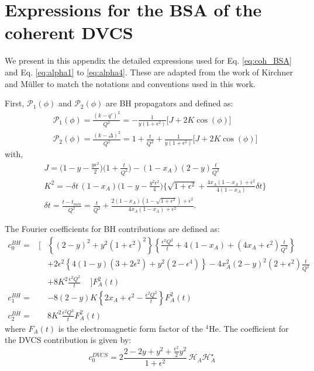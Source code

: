 \documentclass[aps,prc,preprint,superscriptaddress]{revtex4}
\begin{document}
\appendix
\section{Expressions for the BSA of the coherent DVCS}
\label{sec:eq}

We present in this appendix the detailed expressions used for Eq. \ref{eq:coh_BSA} 
and Eq. \ref{eq:alpha1} to \ref{eq:alpha4}. These are adapted from the work of 
Kirchner and Müller \cite{Kirchner:2003wt} to match the notations and conventions used
in this work.
	
First, $\mathcal{P}_{1}(\phi)$ and $\mathcal{P}_{2}(\phi)$ are BH propagators and defined as:
\begin{align}
&\mathcal{P}_{1}(\phi) = \frac{(k - q')^{2}}{Q^{2}} = - \frac{1}{y (1 + \epsilon^{2})} 
\big[ J + 2 K \cos(\phi) \big] \\
&\mathcal{P}_{2}(\phi) = \frac{(k - \Delta)^{2}}{Q^{2}} = 1 + \frac{t}{Q^{2}} + 
\frac{1}{y (1 + \epsilon^{2})} \big[ J + 2 K \cos(\phi) \big]
\end{align}
with,
\begin{align}
& J = \bigg( 1 - y - \frac{y \epsilon^{2}}{2} \bigg) \bigg(1 + \frac{t}{Q^{2}} \bigg) - 
(1 - x_{A})(2 - y) \frac{t}{Q^{2}} \\
& K^{2} = - \delta t \, (1 - x_{A}) \bigg( 1 - y - \frac{y^{2} \epsilon^{2}}{4} \bigg) 
\bigg\{ \sqrt{1 + \epsilon^{2}} + \frac{4 x_{A} (1-x_{A}) + \epsilon^{2}}{4 (1 - x_{A})}
\delta t \bigg\} \\
& \delta t = \frac{t - t_{min}}{Q^{2}} = \frac{t}{Q^{2}} + \frac{2(1-x_{A}) \left(1- \sqrt{1 + 
\epsilon^{2}} \right) + \epsilon^{2}}{4 x_{A} (1- x_{A}) + \epsilon^{2}}.
\end{align}

The Fourier coefficients for BH contributions are defined as:
\begin{eqnarray}
c_0^{BH} = & \bigg[ & \left\{ {(2-y)}^2 + y^2{(1+\epsilon^2)}^2 \right\} 
\left\{ \frac{\epsilon^2 Q^2}{t} + 4 (1-x_A) + (4x_A+\epsilon^2) \frac{t}{Q^2} 
\right\} \nonumber \\
& \phantom{\bigg[} & + 2 \epsilon^2 \left\{ 4(1-y)(3+2\epsilon^2) + y^2(2-\epsilon^4) 
\right\} - 4 x_A^2{(2-y)}^2 (2+\epsilon^2) \frac{t}{Q^2} \nonumber \\
& \phantom{\bigg[} & + 8 K^2 \frac{\epsilon^2 Q^2}{t} \,\,\,\,\,\,\, \bigg] F_A^2(t)  \\
c_1^{BH} = & \phantom{\bigg[} & -8 (2-y) K \left\{ 2 x_A + \epsilon^2 - 
\frac{\epsilon^2 Q^2}{t} \right\} F_A^2(t)  \\
c_2^{BH} = & \phantom{\bigg[} & 8 K^2 \frac{\epsilon^2 Q^2}{t} F_A^2(t) 
\end{eqnarray} 
where $F_A(t)$ is the electromagnetic form factor of the $^4$He. 
The coefficient for the DVCS contribution is given by: 
\begin{equation}
   c_0^{DVCS}= 2 \frac{2-2y+y^2 + \frac{\epsilon^2}{2}y^2}{1 + \epsilon^2} \, 
   {\mathcal H}_A {\mathcal H}^{\star}_A 
   \label{eq:c0DVCS}
\end{equation}
\end{document}

